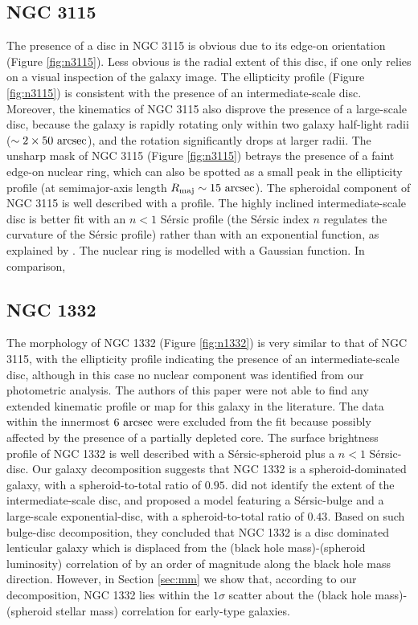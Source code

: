 \documentclass[useAMS,usenatbib,article]{mn2e}
\begin{document}
\subsection{NGC 3115}
The presence of a disc in NGC 3115 is obvious due to its edge-on orientation (Figure \ref{fig:n3115}). 
Less obvious is the radial extent of this disc, if one only relies on a visual inspection of the galaxy image. 
The ellipticity profile (Figure \ref{fig:n3115}) is consistent with the presence of an intermediate-scale disc. 
Moreover, the kinematics of NGC 3115 \citep{arnold2011n3115} also disprove the presence of a large-scale disc, 
because the galaxy is rapidly rotating only within two galaxy half-light radii ($\sim 2 \times 50~\rm arcsec$), 
and the rotation significantly drops at larger radii.  
The unsharp mask of NGC 3115 (Figure \ref{fig:n3115}) betrays the presence of a faint edge-on nuclear ring, 
which can also be spotted as a small peak in the ellipticity profile 
(at semimajor-axis length $R_{\rm maj} \sim 15~\rm arcsec$).
The spheroidal component of NGC 3115 is well described with a \cite{sersic1963} profile.
The highly inclined intermediate-scale disc is better fit with an $n<1$ S\'ersic profile 
(the S\'ersic index $n$ regulates the curvature of the S\'ersic profile) 
rather than with an exponential function, 
as explained by \cite{pastrav2013a}. 
The nuclear ring is modelled with a Gaussian function. 
In comparison, 


\subsection{NGC 1332}
The morphology of NGC 1332 (Figure \ref{fig:n1332}) is very similar to that of NGC 3115, 
with the ellipticity profile indicating the presence of an intermediate-scale disc, 
although in this case no nuclear component was identified from our photometric analysis. 
The authors of this paper were not able to find any extended kinematic profile or map 
for this galaxy in the literature. 
The data within the innermost $6~\rm arcsec$ were excluded from the fit 
because possibly affected by the presence of a partially depleted core.
The surface brightness profile of NGC 1332 is well described with a S\'ersic-spheroid plus
a $n<1$ S\'ersic-disc. 
Our galaxy decomposition suggests that NGC 1332 is a spheroid-dominated galaxy, 
with a spheroid-to-total ratio of $0.95$.
\cite{rusli2011} did not identify the extent of the intermediate-scale disc, 
and proposed a model featuring a S\'ersic-bulge and a large-scale exponential-disc, 
with a spheroid-to-total ratio of $0.43$.
Based on such bulge-disc decomposition, they concluded that NGC 1332 is a disc dominated lenticular galaxy 
which is displaced from the (black hole mass)-(spheroid luminosity) correlation of \cite{marconihunt2003} 
by an order of magnitude along the black hole mass direction. 
However, in Section \ref{sec:mm} we show that, according to our decomposition, 
NGC 1332 lies within the $1\sigma$ scatter about the (black hole mass)-(spheroid stellar mass) correlation 
for early-type galaxies. 
\end{document}
